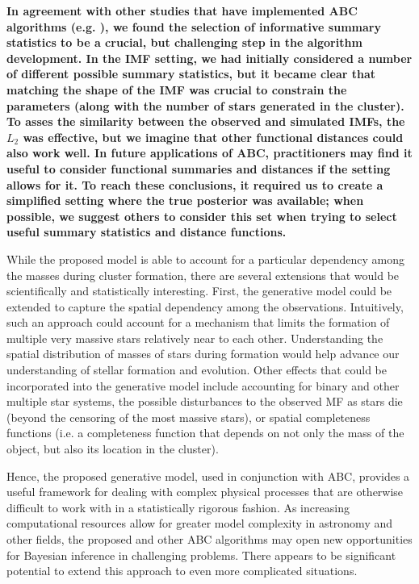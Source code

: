 \documentclass[ejs]{imsart}
\numberwithin{equation}{section}
\theoremstyle{plain}
\newcommand{\new}[1]{{\bf #1}}
\begin{document}
\new{In agreement with other studies that have implemented ABC algorithms (e.g. \citealt{WeyantEtAl2013,IshidaEtAl2015}), we found the selection of informative summary statistics to be a crucial, but challenging step in the algorithm development.  In the IMF setting, we had initially considered a number of different possible summary statistics, but it became clear that matching the shape of the IMF was crucial to constrain the parameters (along with the number of stars generated in the cluster).  
To asses the similarity between the observed and simulated IMFs, the $L_2$ was effective, but we imagine that other functional distances could also work well.  In future applications of ABC, practitioners may find it useful to consider functional summaries and distances if the setting allows for it.
To reach these conclusions, it required us to create a simplified setting where the true posterior was available; when possible, we suggest others to consider this set when trying to select useful summary statistics and distance functions.
}


While the proposed model is able to account for a particular dependency among the masses during cluster formation, there are several extensions that would be scientifically and statistically interesting.   First, the generative model could be extended to capture the spatial dependency among the observations.
Intuitively, such an approach could account for a mechanism that limits the formation of multiple very massive stars relatively near to each other.  
%
Understanding the spatial distribution of masses of stars during formation would help advance our understanding of stellar formation and evolution.  
%
Other effects that could be incorporated into the generative model include accounting for binary and other multiple star systems, the possible disturbances to the observed MF as stars die (beyond the censoring of the most massive stars), or spatial completeness functions (i.e. a completeness function that depends on not only the mass of the object, but also its location in the cluster).  

Hence, the proposed generative model, used in conjunction with ABC, provides a useful framework for 
dealing with complex physical processes that are otherwise difficult to work with in a 
statistically rigorous fashion. As increasing computational resources allow for greater model 
complexity in astronomy and other fields, the proposed and other ABC 
algorithms may open new opportunities for Bayesian inference in challenging problems. There appears to
be significant potential to extend this approach to even more complicated situations.
\end{document}
